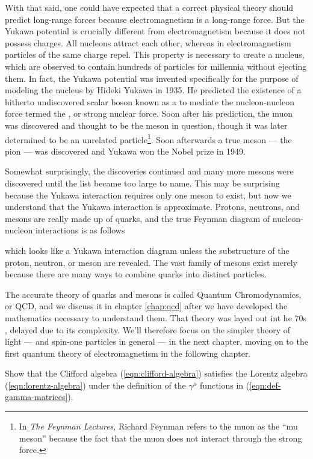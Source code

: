 With that said, one could have expected that a correct physical theory should predict long-range forces because electromagnetism is a long-range force. But the Yukawa potential is crucially different from electromagnetism because it does not possess charges. All nucleons attract each other, whereas in electromagnetism particles of the same charge repel. This property is necessary to create a nucleus, which are observed to contain hundreds of particles for millennia without ejecting them. In fact, the Yukawa potential was invented specifically for the purpose of modeling the nucleus by Hideki Yukawa in 1935. He predicted the existence of a hitherto undiscovered scalar boson known as a  to mediate the nucleon-nucleon force termed the , or strong nuclear force. Soon after his prediction, the muon was discovered and thought to be the meson in question, though it was later determined to be an unrelated particle\footnote{In \textit{The Feynman Lectures}, Richard Feynman refers to the muon as the ``mu meson'' because the fact that the muon does not interact through the strong force.}. Soon afterwards a true meson --- the pion --- was discovered and Yukawa won the Nobel prize in 1949.

Somewhat surprisingly, the discoveries continued and many more mesons were discovered until the list became too large to name. This may be surprising because the Yukawa interaction requires only one meson to exist, but now we understand that the Yukawa interaction is approximate. Protons, neutrons, and mesons are really made up of quarks, and the true Feynman diagram of nucleon-nucleon interactions is as follows 


which looks like a Yukawa interaction diagram unless the substructure of the proton, neutron, or meson are revealed. The vast family of mesons exist merely because there are many ways to combine quarks into distinct particles.

The accurate theory of quarks and mesons is called Quantum Chromodynamics, or QCD, and we discuss it in chapter \ref{chap:qcd} after we have developed the mathematics necessary to understand them. That theory was layed out int he 70s , delayed due to its complexity. We'll therefore focus on the simpler theory of light --- and spin-one particles  in general --- in the next chapter, moving on to the first quantum theory of electromagnetism in the following chapter.



\begin{problem}
  Show that the Clifford algebra (\ref{eqn:clifford-algebra}) satisfies the Lorentz algebra (\ref{eqn:lorentz-algebra}) under the definition of the $\gamma^\mu$ functions in (\ref{eqn:def-gamma-matrices}).
\end{problem}

\begin{problem}

\end{problem}
